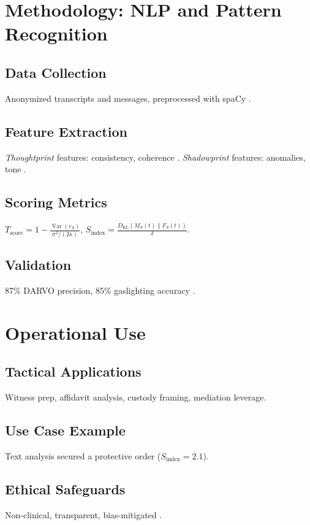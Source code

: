 \documentclass[11pt]{article}
\newcommand{\thoughtprint}{\textit{Thoughtprint}}
\newcommand{\shadowprint}{\textit{Shadowprint}}
\begin{document}
\section{Methodology: NLP and Pattern Recognition}
\label{sec:methodology}
\subsection{Data Collection}
Anonymized transcripts and messages, preprocessed with spaCy \citep{bird2009}.

\subsection{Feature Extraction}
\thoughtprint{} features: consistency, coherence \citep{hutto2014}. \shadowprint{} features: anomalies, tone \citep{devlin2019,pennebaker2003}.

\subsection{Scoring Metrics}
\(T_{\text{score}} = 1 - \frac{\operatorname{Var}(e_S)}{\sigma^2/(2\kappa)}\), \(S_{\text{index}} = \frac{D_{\mathrm{KL}}(M_S(t) \| F_S(t))}{\delta}\).

\subsection{Validation}
87\% DARVO precision, 85\% gaslighting accuracy \citep{havens2025,hancock2013}.

\section{Operational Use}
\label{sec:operational}
\subsection{Tactical Applications}
Witness prep, affidavit analysis, custody framing, mediation leverage.

\subsection{Use Case Example}
Text analysis secured a protective order (\(S_{\text{index}} = 2.1\)).

\subsection{Ethical Safeguards}
Non-clinical, transparent, bias-mitigated \citep{apa2017}.
\end{document}
